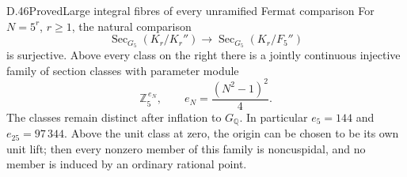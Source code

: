 \begin{statement}{D.46}{Proved}{Large integral fibres of every unramified Fermat comparison}
For \(N=5^r\), \(r\ge1\), the natural comparison
\[
 \operatorname{Sec}_{G_5}(K_r/K_r'')
        \longrightarrow
 \operatorname{Sec}_{G_5}(K_r/F_5'')
                                                               \tag{D.46.1}
\]
is surjective. Above every class on the right
there is a jointly continuous injective family
of section classes with parameter module
\[
              \mathbb Z_5^{\,e_N},\qquad
              e_N=\frac{(N^2-1)^2}{4}.                         \tag{D.46.2}
\]
The classes remain distinct after inflation
to \(G_{\mathbb Q}\). In particular \(e_5=144\)
and \(e_{25}=97\,344\).
Above the unit class at zero, the origin can
be chosen to be its own unit lift; then every
nonzero member of this family is noncuspidal,
and no member is induced by an ordinary
rational point.
\end{statement}
